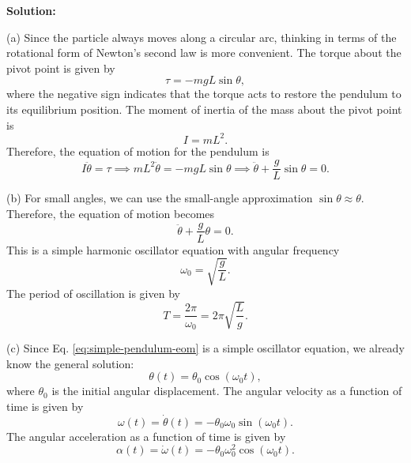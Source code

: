 \documentclass[12pt]{article}
\begin{document}
\textbf{Solution:}

(a) Since the particle always moves along a circular arc, thinking in terms of the rotational form of Newton's second law is more convenient. The torque about the pivot point is given by
\begin{equation}
    \tau=-mgL\sin\theta,
\end{equation}
where the negative sign indicates that the torque acts to restore the pendulum to its equilibrium position. The moment of inertia of the mass about the pivot point is
\begin{equation}
    I=mL^2.
\end{equation}
Therefore, the equation of motion for the pendulum is
\begin{equation}
    I\ddot{\theta}=\tau \implies mL^2\ddot{\theta}=-mgL\sin\theta \implies \ddot{\theta}+\frac{g}{L}\sin\theta=0.
\end{equation}

(b) For small angles, we can use the small-angle approximation $\sin\theta\approx\theta$. Therefore, the equation of motion becomes
\begin{equation}
    \ddot{\theta}+\frac{g}{L}\theta=0.
    \label{eq:simple-pendulum-eom}
\end{equation}
This is a simple harmonic oscillator equation with angular frequency
\begin{equation}
    \omega_0=\sqrt{\frac{g}{L}}.
\end{equation}
The period of oscillation is given by
\begin{equation}
    T=\frac{2\pi}{\omega_0}=2\pi\sqrt{\frac{L}{g}}.
\end{equation}

(c) Since Eq. \eqref{eq:simple-pendulum-eom} is a simple oscillator equation, we already know the general solution:
\begin{equation}
    \theta(t)=\theta_0\cos(\omega_0 t),
\end{equation}
where $\theta_0$ is the initial angular displacement. The angular velocity as a function of time is given by
\begin{equation}
    \omega(t)=\dot{\theta}(t)=-\theta_0\omega_0\sin(\omega_0 t).
\end{equation}
The angular acceleration as a function of time is given by
\begin{equation}
    \alpha(t)=\dot{\omega}(t)=-\theta_0\omega_0^2\cos(\omega_0 t).
\end{equation}
\end{document}
